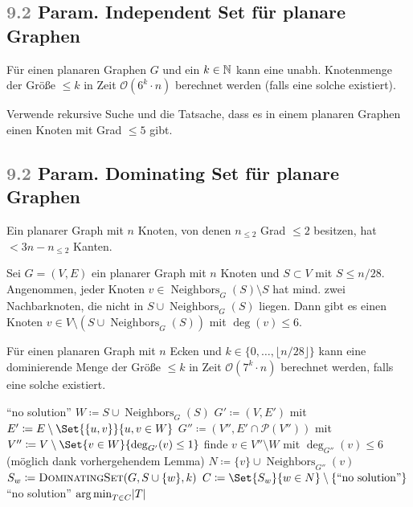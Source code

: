 \documentclass{cheat-sheet}
\newcommand{\size}[1]{\abs{#1}} %
\DeclareMathOperator*{\argmin}{arg\,min}
\newcommand{\Powerset}{\mathcal{P}} %
\renewcommand{\O}{\mathcal{O}} %
\newcommand{\floor}[1]{\lfloor #1 \rfloor} %
\DeclareMathOperator{\Neighbors}{Neighbors} %
\newcommand{\IndentState}[1]{\State \quad #1}
\newcommand{\Problem}[1]{\textcolor{ProblemColor}{\textbf{#1}}}
\newcommand{\scriptSection}[1]{\textcolor{gray}{#1}\enspace}
\begin{document}
\subsection{\scriptSection{9.2} Param. \Problem{Independent Set} für planare Graphen}

\begin{satz}
  Für einen planaren Graphen $G$ und ein $k \in \mathbb{N}$ kann eine unabh. Knotenmenge der Größe $\leq k$ in Zeit $\O(6^k \cdot n)$ berechnet werden (falls eine solche existiert).
\end{satz}

\begin{idee}
  Verwende rekursive Suche und die Tatsache, dass es in einem planaren Graphen einen Knoten mit Grad $\leq 5$ gibt.
\end{idee}

\subsection{\scriptSection{9.2} Param. \Problem{Dominating Set} für planare Graphen}

\begin{lem}
  Ein planarer Graph mit $n$ Knoten, von denen $n_{\leq 2}$ Grad $\leq 2$ besitzen, hat $< 3 n - n_{\leq 2}$ Kanten.
\end{lem}

\begin{lem}
  Sei $G = (V, E)$ ein planarer Graph mit $n$ Knoten und $S \subset V$ mit $S \leq n/28$.
  Angenommen, jeder Knoten $v \in \Neighbors_G(S) \setminus S$ hat mind. zwei Nachbarknoten, die nicht in $S \cup \Neighbors_G(S)$ liegen.
  Dann gibt es einen Knoten $v \in V \setminus (S \cup \Neighbors_G(S))$ mit $\deg(v) \leq 6$.
\end{lem}

\begin{satz}
  Für einen planaren Graph mit $n$ Ecken und $k \in \{ 0, \ldots, \floor{n / 28} \}$ kann eine dominierende Menge der Größe $\leq k$ in Zeit $\O(7^k \cdot n)$ berechnet werden, falls eine solche existiert.
\end{satz}

\begin{algorithmic}
    \If{$\size{S} > k$} \Return ``no solution'' \EndIf
    \State $W \coloneqq S \cup \Neighbors_G(S)$
    \State $G' \coloneqq (V, E')$ mit $E' \coloneqq E \setminus \Set{\{ u, v \}}{u, v \in W}$
    \State $G'' \coloneqq (V'', E' \cap \Powerset(V''))$ mit $V'' \coloneqq V \setminus \Set{v \in W}{\deg_{G'}(v) \leq 1}$
    \State finde $v \in V'' \setminus W$ mit $\deg_{G''}(v) \leq 6$
    \IndentState (möglich dank vorhergehendem Lemma)
    \State $N \coloneqq \{ v \} \cup \Neighbors_{G''}(v)$
      $S_w \coloneqq \Call{DominatingSet}{G, S \cup \{ w \}, k}$
    \EndFor
    \State $C \coloneqq \Set{S_w}{w \in N} \setminus \{ \text{``no solution''} \}$
     \Return ``no solution'' \EndIf
    \State \Return ${\argmin}_{T \in C} \size{T}$
  \EndFunction
\end{algorithmic}
\end{document}
